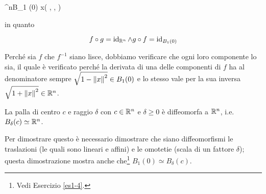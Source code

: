 	{\R^{n}}{B_{1} (0)}
	{x}{\left( , \cdots,  \right)}

in quanto

\begin{equation}
	f \circ g = \operatorname{id}_{\mathbb{R}^{n}} \wedge g \circ f = \operatorname{id}_{B_{1} (0)}
\end{equation}

Perché sia $ f $ che $ f^{-1} $ siano lisce, dobbiamo verificare che ogni loro componente lo sia, il quale è verificato perché la derivata di una delle componenti di $ f $ ha al denominatore sempre $ \sqrt{1 - \norm{x}^{2}} \in B_{1} (0) $ e lo stesso vale per la sua inversa $ \sqrt{1 + \norm{x}^{2}} \in \mathbb{R}^{n} $.

\begin{corollary}
	La palla di centro $ c $ e raggio $ \delta $ con $ c \in \mathbb{R}^{n} $ e $ \delta \geqslant 0 $ è diffeomorfa a $ \mathbb{R}^{n} $, i.e. $ B_{\delta} (c) \simeq \mathbb{R}^{n} $.
\end{corollary}

Per dimostrare questo è necessario dimostrare che siano diffeomorfismi le traslazioni (le quali sono lineari e affini) e le omotetie (scala di un fattore $ \delta $); questa dimostrazione mostra anche che\footnote{%
	Vedi Esercizio \ref{es1-4}.%
} $ B_{1} (0) \simeq B_{\delta} (c) $.


